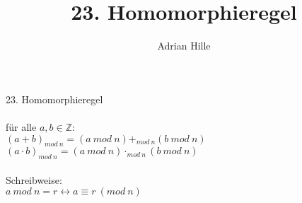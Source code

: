 \documentclass{scrartcl}
\title{23. Homomorphieregel}
\author{Adrian Hille}
\begin{document}
\Large 23. Homomorphieregel\\
\\
\normalsize
f\"ur alle $a, b \in \mathbb{Z}$:\\
$(a+b)_{mod~n}=(a~mod~n)+_{mod~n}(b~mod~n)$\\
$(a\cdot b)_{mod~n}=(a~mod~n)\cdot_{mod~n}(b~mod~n)$\\
\\
Schreibweise:\\
$a~mod~n = r \leftrightarrow a \equiv r~(mod~n)$
\end{document}
